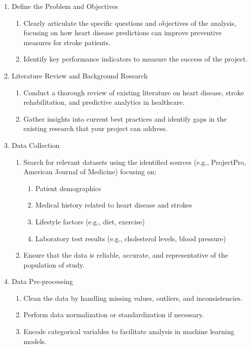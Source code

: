\documentclass[runningheads]{llncs}
\begin{document}
\begin{enumerate}
    \item Define the Problem and Objectives
    \begin{enumerate}
        \item Clearly articulate the specific questions and objectives of the analysis, focusing on how heart disease predictions can improve preventive measures for stroke patients.
         \item Identify key performance indicators to measure the success of the project. 
    \end{enumerate}

\item  Literature Review and Background Research
\begin{enumerate}
    \item Conduct a thorough review of existing literature on heart disease, stroke rehabilitation, and predictive analytics in healthcare. 
    \item Gather insights into current best practices and identify gaps in the existing research that your project can address. 
\end{enumerate}

\item Data Collection
\begin{enumerate}
    \item Search for relevant datasets using the identified sources (e.g., ProjectPro, American Journal of Medicine) focusing on: 
    \begin{enumerate}
        \item Patient demographics 
        \item Medical history related to heart disease and strokes 
        \item Lifestyle factors (e.g., diet, exercise) 
        \item Laboratory test results (e.g., cholesterol levels, blood pressure) 
    \end{enumerate}
    \item Ensure that the data is reliable, accurate, and representative of the population of study. 
\end{enumerate}

\item Data Pre-processing
    \begin{enumerate}
        \item Clean the data by handling missing values, outliers, and inconsistencies. 
        \item Perform data normalization or standardization if necessary. 
        \item Encode categorical variables to facilitate analysis in machine learning models. 
    \end {enumerate}
    

\end{enumerate}
\end{document}
